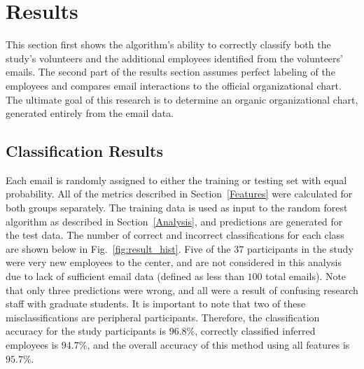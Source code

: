 \documentclass[10pt,twocolumn,conference]{IEEEtran}
\begin{document}
\section{Results} \label{Results}
This section first shows the algorithm's ability to correctly classify both the study's volunteers and the additional employees identified from the volunteers' emails.
The second part of the results section assumes perfect labeling of the employees and compares email interactions to the official organizational chart.
The ultimate goal of this research is to determine an organic organizational chart, generated entirely from the email data.

\subsection{Classification Results}\label{ssec:class_results}
Each email is randomly assigned to either the training or testing set with equal probability.
All of the metrics described in Section~\ref{Features} were calculated for both groups separately.
The training data is used as input to the random forest algorithm as described in Section~\ref{Analysis}, and predictions are generated for the test data.
The number of correct and incorrect classifications for each class are shown below in Fig.~\ref{fig:result_hist}.
Five of the $37$ participants in the study were very new employees to the center, and are not considered in this analysis due to lack of sufficient email data (defined as less than $100$ total emails).
Note that only three predictions were wrong, and all were a result of confusing research staff with graduate students.
It is important to note that two of these misclassifications are peripheral participants.
Therefore, the classification accuracy for the study participants is $96.8\%$, correctly classified inferred employees is $94.7\%$, and the overall accuracy of this method using all features is $95.7\%$.
\end{document}
